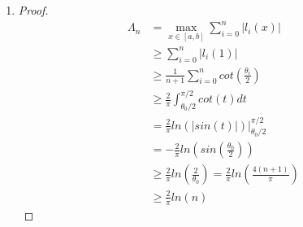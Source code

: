 \documentclass[paper=a4, fontsize=11pt]{scrartcl} %
\numberwithin{equation}{section} %
\numberwithin{figure}{section} %
\numberwithin{table}{section} %
\begin{document}
\begin{enumerate}
\begin{enumerate}
			\item 
				\begin{proof}
					As $\theta_n = \frac{2n+1}{2n+2}\pi < \pi$, $\theta_{n+1} = \frac{2n+3}{2n+2} > \pi$, and $cot(x)$ is positive over $(0, \frac{\pi}{2})$, while negative otherwise.
					Thus
					\begin{equation}
							\int_{\frac{\theta_0}{2}}^{\frac{\pi}{2}} cot(t) dt 
							\leq \int_{\frac{\theta_0}{2}}^{\frac{\theta_n}{2}} cot(t) dt
							= \sum_{k=0}^{n-1} \int_{\frac{\theta_k}{2}}^{\frac{\theta_{k+1}}{2}} cot(t) dt
					\end{equation}
					Hence
					\begin{equation}
						\int_{\frac{\theta_0}{2}}^{\frac{\pi}{2}} cot(t) dt \leq \frac{\pi}{2(n+1)} \sum_{i=0}^{n}cot(\frac{\theta_i}{2})
					\end{equation}
					(... not fine)
				\end{proof}
			
		\end{enumerate}

	\item 
		\begin{proof}
			\begin{equation}
				\begin{aligned}
					\Lambda_n & = \max_{x \in [a, b]} \sum_{i=0}^{n} |l_i(x)|\\
							  & \geq \sum_{i=0}^{n} |l_i(1)|\\
							  & \geq \frac{1}{n+1} \sum_{i=0}^{n} cot(\frac{\theta_i}{2})\\
							  & \geq \frac{2}{\pi} \int_{\theta_0 / 2}^{\pi/2} cot(t)dt\\
							  & = \frac{2}{\pi} ln(|sin(t)|) \Bigg| _{\theta_0/2}^{\pi/2}\\
							  & = - \frac{2}{\pi} ln(sin(\frac{\theta_0}{2}))\\
							  & \geq \frac{2}{\pi} ln(\frac{2}{\theta_0}) = \frac{2}{\pi} ln(\frac{4(n+1)}{\pi})\\
							  & \ge \frac{2}{\pi} ln(n)
				\end{aligned}
			\end{equation}
		\end{proof}
	
\end{enumerate}


\end{document}
